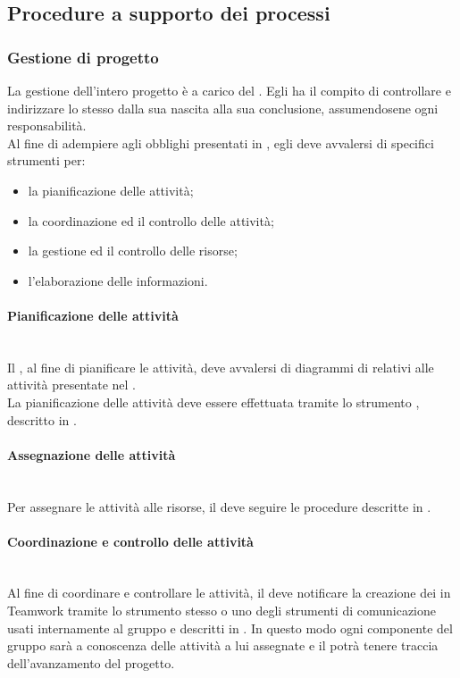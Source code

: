 \subsection{Procedure a supporto dei processi}

\subsubsection{Gestione di progetto}
La gestione dell'intero progetto è a carico del \Responsabile. Egli ha il compito di controllare e indirizzare lo stesso dalla sua nascita alla sua conclusione, assumendosene ogni responsabilità.\\
Al fine di adempiere agli obblighi presentati in , egli deve avvalersi di specifici strumenti per:
\begin{itemize}
	\item la pianificazione delle attività;
	\item la coordinazione ed il controllo delle attività;
	\item la gestione ed il controllo delle risorse;
	\item l'elaborazione delle informazioni.
\end{itemize}

\paragraph{Pianificazione delle attività}\mbox{}\\
Il \Responsabile, al fine di pianificare le attività, deve avvalersi di diagrammi di  relativi alle attività presentate nel \PianoDiProgetto.\\
La pianificazione delle attività deve essere effettuata tramite lo strumento , descritto in .

\paragraph{Assegnazione delle attività}\mbox{}\\
Per assegnare le attività alle risorse, il \Responsabile{} deve seguire le procedure descritte in .

\paragraph{Coordinazione e controllo delle attività}\mbox{}\\
Al fine di coordinare e controllare le attività, il \Responsabile{} deve notificare la creazione dei  in Teamwork tramite lo strumento stesso o uno degli strumenti di comunicazione usati internamente al gruppo e descritti in . In questo modo ogni componente del gruppo sarà a conoscenza delle attività a lui assegnate e il \Responsabile{} potrà tenere traccia dell'avanzamento del progetto.

